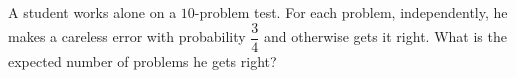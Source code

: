 A student works alone on a $10$-problem test. For each problem, independently, he makes a careless error with probability $\dfrac34$ and otherwise gets it right. What is the expected number of problems he gets right?
